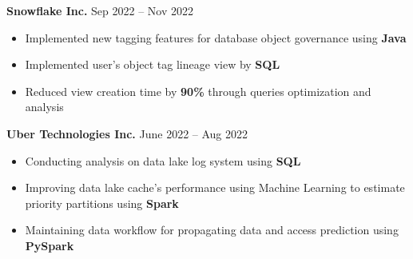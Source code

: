 \documentclass[11pt]{article}
\begin{document}
\hspace{10pt}\textbf{Snowflake Inc.} \hfill {\small Sep 2022 -- Nov 2022} \\
  \vspace{-2pt}
  \begin{itemize}[leftmargin=31pt]
    \vspace{-10pt}
    \setlength\itemsep{-5pt}
    \item {\small Implemented new tagging features for database object governance using \textbf{Java}}
    \item {\small Implemented user's object tag lineage view by \textbf{SQL}}
    \item {\small Reduced view creation time by \textbf{90\%} through queries optimization and analysis}
    \vspace{-7pt}
  \end{itemize}

\hspace{10pt}\textbf{Uber Technologies Inc.} \hfill {\small June 2022 -- Aug 2022} \\
  \vspace{-2pt}
  \begin{itemize}[leftmargin=31pt]
    \vspace{-10pt}
    \setlength\itemsep{-5pt}
    \item {\small Conducting analysis on data lake log system using \textbf{SQL}}
    \item {\small Improving data lake cache's performance using Machine Learning to estimate priority partitions using \textbf{Spark}}
    \item {\small Maintaining data workflow for propagating data and access prediction using \textbf{PySpark}}
    \vspace{-7pt}
  \end{itemize}
\end{document}
